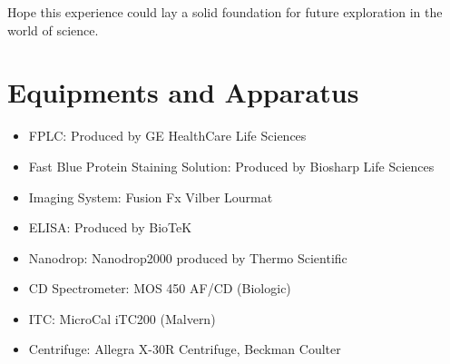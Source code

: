 \documentclass{report}
\begin{document}
Hope this experience could lay a solid foundation for future exploration in the world of science.


\appendix

\chapter{Equipments and Apparatus}
\begin{itemize}
    \item FPLC: Produced by GE HealthCare Life Sciences
    \item Fast Blue Protein Staining Solution: Produced by Biosharp Life Sciences
    \item Imaging System: Fusion Fx Vilber Lourmat
    \item ELISA: Produced by BioTeK
    \item Nanodrop: Nanodrop2000 produced by Thermo Scientific
    \item CD Spectrometer: MOS 450 AF/CD (Biologic)
    \item ITC: MicroCal iTC200 (Malvern)
    \item Centrifuge: Allegra X-30R Centrifuge, Beckman Coulter

\end{itemize}


\end{document}

